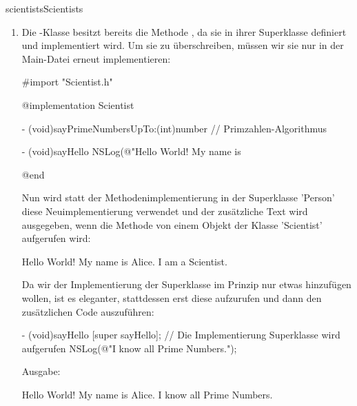 \documentclass[parskip=half, final]{scrreprt}
\begin{document}
\begin{lsg}
\begin{lsgitem}{scientists}{Scientists}
\begin{enumerate}
\begin{objclst}
{    Scientist *aScientist = [[Scientist alloc] init];
    aScientist.name = @"Alice";
    [aScientist sayHello];

    return YES;
}

@end
\end{objclst}

Es wird wieder ausgegeben:

\begin{objclst}
Hello World! My name is Alice.
\end{objclst}

\item Die -Klasse besitzt bereits die Methode , da sie in ihrer Superklasse  definiert und implementiert wird. Um sie zu überschreiben, müssen wir sie nur in der Main-Datei erneut implementieren:

\begin{objclst}
#import "Scientist.h"

@implementation Scientist

- (void)sayPrimeNumbersUpTo:(int)number {
    // Primzahlen-Algorithmus
}

- (void)sayHello {
    NSLog(@"Hello World! My name is %
}

@end
\end{objclst}

Nun wird statt der Methodenimplementierung in der Superklasse 'Person' diese Neuimplementierung verwendet und der zusätzliche Text wird ausgegeben, wenn die Methode  von einem Objekt der Klasse 'Scientist' aufgerufen wird:

\begin{objclst}
Hello World! My name is Alice. I am a Scientist.
\end{objclst}

Da wir der Implementierung der Superklasse im Prinzip nur etwas hinzufügen wollen, ist es eleganter, stattdessen erst diese aufzurufen und dann den zusätzlichen Code auszuführen: 

\begin{objclst}
- (void)sayHello {
    [super sayHello]; // Die Implementierung Superklasse wird aufgerufen
    NSLog(@"I know all Prime Numbers.");
}
\end{objclst}

Ausgabe:

\begin{objclst}
Hello World! My name is Alice.
I know all Prime Numbers.
\end{objclst}


\end{enumerate}
\end{lsgitem}
\end{lsg}
\end{document}
